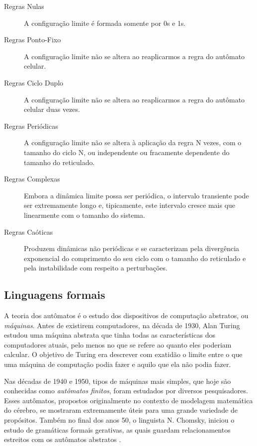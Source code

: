 \documentclass[12pt,a4paper]{article}
\begin{document}
\begin{description}
\item[Regras Nulas] A configuração limite é formada somente por 0s e 1s.

\item[Regras Ponto-Fixo] A configuração limite não se altera ao
reaplicarmos a regra do autômato celular.

\item[Regras Ciclo Duplo] A configuração limite não se altera ao
reaplicarmos a regra do autômato celular duas vezes.

\item[Regras Periódicas] A configuração limite não se altera à aplicação
da regra N vezes, com o tamanho do ciclo N, ou independente ou fracamente
dependente do tamanho do reticulado.

\item[Regras Complexas] Embora a dinâmica limite possa ser periódica,
o intervalo transiente pode ser extremamente longo e, tipicamente,
este intervalo cresce mais que linearmente com o tamanho do sistema.

\item[Regras Caóticas] Produzem dinâmicas não periódicas e se caracterizam
pela divergência exponencial do comprimento do seu ciclo com o tamanho do
reticulado e pela instabilidade com respeito a perturbações.
\end{description}

\subsection{Linguagens formais}

A teoria dos autômatos é o estudo dos dispositivos de computação abstratos,
ou \textit{máquinas}. Antes de existirem computadores, na década de 1930, Alan
Turing estudou uma máquina abstrata que tinha todas as características dos
computadores atuais, pelo menos no que se refere ao quanto eles poderiam 
calcular. O objetivo de Turing era descrever com exatidão o limite entre
o que uma máquina de computação podia fazer e aquilo que ela não podia fazer.

Nas décadas de 1940 e 1950, tipos de máquinas mais simples, que hoje são
conhecidas como \textit{autômatos finitos}, foram estudados por diversos
pesquisadores. Esses autômatos, propostos originalmente no contexto de
modelagem matemática do cérebro, se mostraram extremamente úteis para uma grande variedade
de propósitos. Também no final dos anos 50, o linguista N. Chomsky, iniciou
o estudo de gramáticas formais gerativas, as quais guardam relacionamentos
estreitos com os autômatos abstratos .
\end{document}
